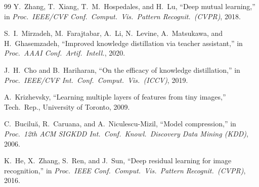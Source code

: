 \documentclass[11pt]{article}
\begin{document}
\begin{thebibliography}{99}
Y.~Zhang, T.~Xiang, T.~M.~Hospedales, and H.~Lu,
``Deep mutual learning,''
in \emph{Proc.\ IEEE/CVF Conf.\ Comput.\ Vis.\ Pattern Recognit.\ (CVPR)}, 2018.

S.~I.~Mirzadeh, M.~Farajtabar, A.~Li, N.~Levine, A.~Matsukawa, and H.~Ghasemzadeh,
``Improved knowledge distillation via teacher assistant,''
in \emph{Proc.\ AAAI Conf.\ Artif.\ Intell.}, 2020.

J.~H.~Cho and B.~Hariharan,
``On the efficacy of knowledge distillation,''
in \emph{Proc.\ IEEE/CVF Int.\ Conf.\ Comput.\ Vis.\ (ICCV)}, 2019.

A.~Krizhevsky,
``Learning multiple layers of features from tiny images,''
Tech.\ Rep., University of Toronto, 2009.

C.~Bucilu\u{a}, R.~Caruana, and A.~Niculescu-Mizil,
``Model compression,''
in \emph{Proc.\ 12th ACM SIGKDD Int.\ Conf.\ Knowl.\ Discovery Data Mining (KDD)}, 2006.

K.~He, X.~Zhang, S.~Ren, and J.~Sun,
``Deep residual learning for image recognition,''
in \emph{Proc.\ IEEE Conf.\ Comput.\ Vis.\ Pattern Recognit.\ (CVPR)}, 2016.

\end{thebibliography}
\end{document}
